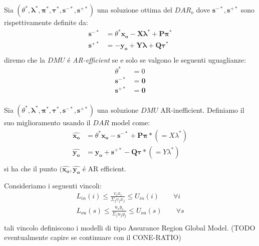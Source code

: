 \begin{definiz} Sia $(\theta^*, \boldsymbol{\lambda^*, \pi^*, \tau^*, s^{-*}, s^{+*}})$ una soluzione ottima del $DAR_o$ dove $\boldsymbol{s^{-*}, s^{+*}}$ sono rispettivamente definite da:
\begin{equation}
\begin{split}
\boldsymbol{s^{-*}} & = \theta^* \boldsymbol{x_o - X \lambda^* + P\pi^*} \\
\boldsymbol{s^{+*}} & = \boldsymbol{-y_o + Y\lambda + Q \tau^*} \\
\end{split}
\end{equation}
diremo che la $DMU$ \'e \emph{AR-efficient} se e solo se valgono le seguenti uguaglianze:
\begin{equation}
\begin{split}
\theta^* & = 0 \\
\boldsymbol{s^{-*}} & = \boldsymbol{0} \\
\boldsymbol{s^{+*}} & = \boldsymbol{0} \\
\end{split}
\end{equation}
\end{definiz}
\begin{teor} Sia $(\theta^*, \boldsymbol{\lambda^*, \pi^*, \tau^*, s^{-*}, s^{+*}})$ una soluzione $DMU$ AR-inefficient. Definiamo il suo miglioramento usando il $DAR$ model come:
\begin{equation}
\begin{split}
\boldsymbol{\hat{x_o}} & = \theta^* \boldsymbol{x_o - s^{-*} + P\pi*} ( = X\lambda^*) \\
\boldsymbol{\hat{y_o}} & = \boldsymbol{y_o + s^{+*} - Q\tau*} ( = Y\lambda^*) \\ 
\end{split}
\end{equation}
si ha che il punto $(\boldsymbol{\hat{x_o}, \hat{y_o}}$ \'e AR efficient.
\end{teor}
\begin{oss} Consideriamo i seguenti vincoli: 
\begin{equation}
\begin{split}
L_{in}(i) \leq \frac{v_i x_i}{\Sigma_j v_j x_j} \leq U_{in}(i) \qquad \forall i  \\
L_{ou}(s) \leq \frac{u_s y_s}{\Sigma_j u_j y_j} \leq U_{ou}(s) \qquad \forall s  \\
\end{split}
\end{equation} 
tali vincolo definiscono i modelli di tipo Assurance Region Global Model. (TODO eventualmente capire se continuare con il CONE-RATIO)
\end{oss}
